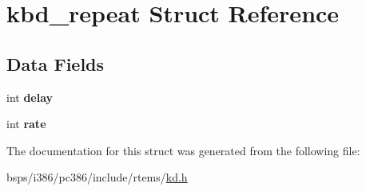 \hypertarget{structkbd__repeat}{}\section{kbd\+\_\+repeat Struct Reference}
\label{structkbd__repeat}
\subsection*{Data Fields}
\begin{DoxyCompactItemize}
\item 
\mbox{\label{structkbd__repeat_af6fc0a6f3509757676b134cb08e7f804}} 
int {\bfseries delay}
\item 
\mbox{\label{structkbd__repeat_af8d329b393d9e1dfd70e69276025d07b}} 
int {\bfseries rate}
\end{DoxyCompactItemize}


The documentation for this struct was generated from the following file\+:\begin{DoxyCompactItemize}
\item 
bsps/i386/pc386/include/rtems/\mbox{\hyperlink{kd_8h}{kd.\+h}}\end{DoxyCompactItemize}
